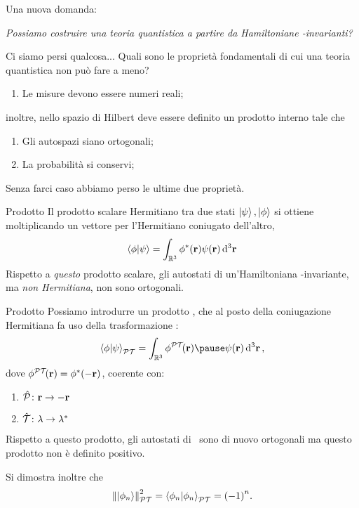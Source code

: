\begin{frame}
    Una nuova domanda:
    \begin{center}
        {\it Possiamo costruire una teoria quantistica a partire da Hamiltoniane \PT-invarianti?}
    \end{center}
\end{frame}

\begin{frame}{Ci siamo persi qualcosa...}
    Quali sono le proprietà fondamentali di cui una teoria quantistica non può fare a meno?
    \begin{enumerate}
        \pause
        \item[\ding{51}] Le misure devono essere numeri reali;
    \end{enumerate}
    \pause
    inoltre, nello spazio di Hilbert deve essere definito un prodotto interno tale che
    \begin{enumerate}
        \pause
        \item[\ding{55}] Gli autospazi siano ortogonali;
        \pause
        \item[\ding{55}] La probabilità si conservi;
    \end{enumerate}
    \pause
    Senza farci caso abbiamo perso le ultime due proprietà.
\end{frame}

\begin{frame}{Prodotto \PT}
    Il prodotto scalare Hermitiano tra due stati $\ket{\psi},\ket{\phi}$ si ottiene moltiplicando un vettore per l'Hermitiano coniugato dell'altro,
    $$
        \braket{\phi}{\psi} = \int\nolimits_{\bbR^3}\phi^*\pqty{\vb{r}}\psi\pqty{\vb{r}} \dd[3]{\vb{r}}
    $$
    \pause
    Rispetto a \emph{questo} prodotto scalare, gli autostati di un'Hamiltoniana \PT-invariante, ma \emph{non Hermitiana}, non sono ortogonali.
\end{frame}

\begin{frame}{Prodotto \PT}
    Possiamo introdurre un prodotto \PT, che al posto della coniugazione Hermitiana fa uso della trasformazione \hPT :
    \pause
    $$
        \braket{\phi}{\psi}_{\PT} = \int\nolimits_{\bbR^3} \phi^{\PT}\!\pqty{\vb{r}}\pause\psi\pqty{\vb{r}} \dd[3]{\vb{r}}
        \mycomma
    $$
    \pause
    dove $\phi^{\PT}\!\pqty{\vb{r}} = \phi^*\pqty{-\vb{r}}$, \pause coerente con:
    \begin{enumerate}[label=\mybullet]
        \item $\mathcal{\hat{P}}\colon\vb{r}\rightarrow-\vb{r}$
        \item $\mathcal{\hat{T}}\colon\lambda\rightarrow\lambda^*$
    \end{enumerate}
    \pause
    Rispetto a questo prodotto, gli autostati di \hH\ sono di nuovo ortogonali ma questo prodotto non è definito positivo.

    \pause
    Si dimostra inoltre che
    \begin{equation*}
        \norm{\ket{\phi_n}}_{\PT}^2 = \braket{\phi_n}{\phi_n}_{\PT} = \pqty{-1}^n
        \myperiod
    \end{equation*}
\end{frame}

